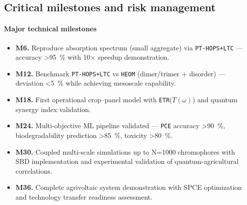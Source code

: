 \documentclass[12pt, a4paper]{article}
\begin{document}
\subsection{Critical milestones and risk management}

\paragraph{Major technical milestones}
\begin{itemize}
    \item \textbf{M6.} Reproduce absorption spectrum (small aggregate) via \texttt{PT-HOPS+LTC} — accuracy \SI{>95}{\percent} with 10× speedup demonstration.
    \item \textbf{M12.} Benchmark \texttt{PT-HOPS+LTC} vs \texttt{HEOM} (dimer/trimer + disorder) — deviation \SI{<5}{\percent} while achieving mesoscale capability.
    \item \textbf{M18.} First operational crop–panel model with \texttt{ETR}($T(\omega)$) and quantum synergy index validation.
    \item \textbf{M24.} Multi-objective ML pipeline validated — \texttt{PCE} accuracy \SI{>90}{\percent}, biodegradability prediction \SI{>85}{\percent}, toxicity \SI{>80}{\percent}.
    \item \textbf{M30.} Coupled multi-scale simulations up to N=\num{1000} chromophores with SBD implementation and experimental validation of quantum-agricultural correlations.
    \item \textbf{M36.} Complete agrivoltaic system demonstration with SPCE optimization and technology transfer readiness assessment.
\end{itemize}
\end{document}
